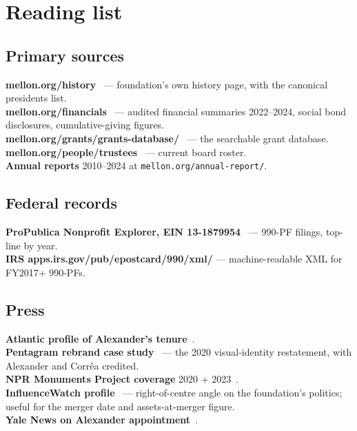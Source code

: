 \documentclass[10pt,letterpaper,twocolumn]{article}
\begin{document}
\section{Reading list}

\subsection{Primary sources}

\textbf{mellon.org/history}~\citep{mellonhistory} --- foundation's own history page, with the canonical presidents list.\\
\textbf{mellon.org/financials}~\citep{mellonfinancials} --- audited financial summaries 2022--2024, social bond disclosures, cumulative-giving figures.\\
\textbf{mellon.org/grants/grants-database/}~\citep{mellongrantsdb} --- the searchable grant database.\\
\textbf{mellon.org/people/trustees}~\citep{mellontrustees} --- current board roster.\\
\textbf{Annual reports} 2010--2024 at \texttt{mellon.org/annual-report/}.

\subsection{Federal records}

\textbf{ProPublica Nonprofit Explorer, EIN 13-1879954}~\citep{propublicamellon} --- 990-PF filings, top-line by year.\\
\textbf{IRS apps.irs.gov/pub/epostcard/990/xml/} --- machine-readable XML for FY2017+ 990-PFs.

\subsection{Press}

\textbf{Atlantic profile of Alexander's tenure}~\citep{atlantic2023mellon}.\\
\textbf{Pentagram rebrand case study}~\citep{pentagramrebrand} --- the 2020 visual-identity restatement, with Alexander and Corr\^ea credited.\\
\textbf{NPR Monuments Project coverage} 2020 + 2023~\citep{nprmonuments2020,nprmonuments2023}.\\
\textbf{InfluenceWatch profile}~\citep{influencewatchmellon} --- right-of-centre angle on the foundation's politics; useful for the merger date and assets-at-merger figure.\\
\textbf{Yale News on Alexander appointment}~\citep{yalealexander2018}.
\end{document}
